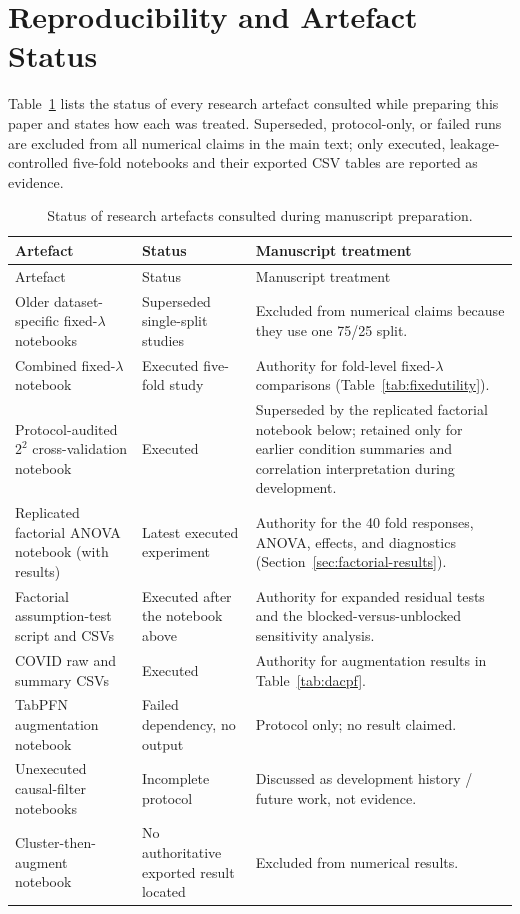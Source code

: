 \section{Reproducibility and Artefact Status}
\label{app:audit}

Table~\ref{tab:audit} lists the status of every research artefact consulted while preparing this paper and states how each was treated. Superseded, protocol-only, or failed runs are excluded from all numerical claims in the main text; only executed, leakage-controlled five-fold notebooks and their exported CSV tables are reported as evidence.

\begin{longtable}{>{\raggedright\arraybackslash}p{}>{\raggedright\arraybackslash}p{}>{\raggedright\arraybackslash}p{}}
\caption{Status of research artefacts consulted during manuscript preparation.}\label{tab:audit}\\
\toprule
Artefact & Status & Manuscript treatment\\
\midrule
\endfirsthead
\toprule
Artefact & Status & Manuscript treatment\\
\midrule
\endhead
Older dataset-specific fixed-$\lambda$ notebooks & Superseded single-split studies & Excluded from numerical claims because they use one 75/25 split.\\
Combined \sepa{} fixed-$\lambda$ notebook & Executed five-fold study & Authority for fold-level fixed-$\lambda$ comparisons (Table~\ref{tab:fixedutility}).\\
Protocol-audited $2^2$ cross-validation notebook & Executed & Superseded by the replicated factorial notebook below; retained only for earlier condition summaries and correlation interpretation during development.\\
Replicated factorial ANOVA notebook (with results) & Latest executed experiment & Authority for the 40 fold responses, ANOVA, effects, and diagnostics (Section~\ref{sec:factorial-results}).\\
Factorial assumption-test script and CSVs & Executed after the notebook above & Authority for expanded residual tests and the blocked-versus-unblocked sensitivity analysis.\\
COVID \dacpf{} raw and summary CSVs & Executed & Authority for augmentation results in Table~\ref{tab:dacpf}.\\
TabPFN augmentation notebook & Failed dependency, no output & Protocol only; no result claimed.\\
Unexecuted causal-filter notebooks & Incomplete protocol & Discussed as development history / future work, not evidence.\\
Cluster-then-augment notebook & No authoritative exported result located & Excluded from numerical results.\\
\bottomrule
\end{longtable}

